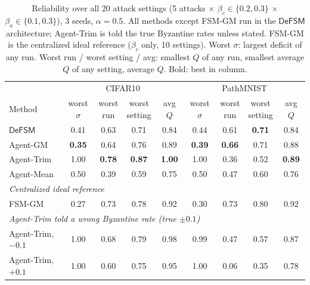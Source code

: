 \begin{table}[t]
\centering\small
\caption{Reliability over all 20 attack settings (5 attacks $\times$ $\beta_c\in\{0.2,0.3\}$ $\times$ $\beta_a\in\{0.1,0.3\}$), 3 seeds, $\alpha=0.5$. All methods except FSM-GM run in the $\mathsf{DeFSM}$ architecture; Agent-Trim is told the true Byzantine rates unless stated. FSM-GM is the centralized ideal reference ($\beta_c$ only, 10 settings). Worst $\sigma$: largest deficit of any run. Worst run / worst setting / avg: smallest $Q$ of any run, smallest average $Q$ of any setting, average $Q$. Bold: best in column.}
\label{tab:summary}
\setlength{\tabcolsep}{2.2pt}
\begin{tabular}{lcccccccc}
\toprule
& \multicolumn{4}{c}{CIFAR10} & \multicolumn{4}{c}{PathMNIST}\\
\cmidrule(lr){2-5}\cmidrule(lr){6-9}
Method & \makecell{worst\\$\sigma$} & \makecell{worst\\run} & \makecell{worst\\setting} & \makecell{avg\\$Q$} & \makecell{worst\\$\sigma$} & \makecell{worst\\run} & \makecell{worst\\setting} & \makecell{avg\\$Q$}\\
\midrule
$\mathsf{DeFSM}$ & 0.41 & 0.63 & 0.71 & 0.84 & 0.44 & 0.61 & \textbf{0.71} & 0.84\\
\midrule
Agent-GM & \textbf{0.35} & 0.64 & 0.76 & 0.89 & \textbf{0.39} & \textbf{0.66} & 0.71 & 0.88\\
Agent-Trim & 1.00 & \textbf{0.78} & \textbf{0.87} & \textbf{1.00} & 1.00 & 0.36 & 0.52 & \textbf{0.89}\\
Agent-Mean & 0.50 & 0.39 & 0.59 & 0.75 & 0.50 & 0.47 & 0.60 & 0.76\\
\midrule\multicolumn{9}{l}{\emph{Centralized ideal reference}}\\
FSM-GM & 0.27 & 0.73 & 0.78 & 0.92 & 0.30 & 0.73 & 0.80 & 0.92\\
\midrule\multicolumn{9}{l}{\emph{Agent-Trim told a wrong Byzantine rate (true $\pm0.1$)}}\\
Agent-Trim, $-0.1$ & 1.00 & 0.68 & 0.79 & 0.98 & 0.99 & 0.47 & 0.57 & 0.87\\
Agent-Trim, $+0.1$ & 1.00 & 0.60 & 0.75 & 0.95 & 1.00 & 0.06 & 0.35 & 0.78\\
\bottomrule
\end{tabular}
\end{table}
